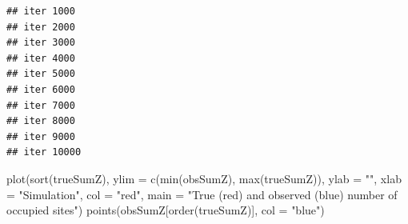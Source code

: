 \documentclass[
]{book}
\newenvironment{Shaded}{\begin{snugshade}}{\end{snugshade}}
\newcommand{\AttributeTok}[1]{\textcolor[rgb]{0.77,0.63,0.00}{#1}}
\newcommand{\CommentTok}[1]{\textcolor[rgb]{0.56,0.35,0.01}{\textit{#1}}}
\newcommand{\ConstantTok}[1]{\textcolor[rgb]{0.00,0.00,0.00}{#1}}
\newcommand{\ControlFlowTok}[1]{\textcolor[rgb]{0.13,0.29,0.53}{\textbf{#1}}}
\newcommand{\DecValTok}[1]{\textcolor[rgb]{0.00,0.00,0.81}{#1}}
\newcommand{\FunctionTok}[1]{\textcolor[rgb]{0.00,0.00,0.00}{#1}}
\newcommand{\NormalTok}[1]{#1}
\newcommand{\OtherTok}[1]{\textcolor[rgb]{0.56,0.35,0.01}{#1}}
\newcommand{\SpecialCharTok}[1]{\textcolor[rgb]{0.00,0.00,0.00}{#1}}
\newcommand{\StringTok}[1]{\textcolor[rgb]{0.31,0.60,0.02}{#1}}
\begin{document}
\begin{Shaded}
\end{Shaded}

\begin{verbatim}
## iter 1000 
## iter 2000 
## iter 3000 
## iter 4000 
## iter 5000 
## iter 6000 
## iter 7000 
## iter 8000 
## iter 9000 
## iter 10000
\end{verbatim}

\begin{Shaded}
\begin{Highlighting}[]
\FunctionTok{plot}\NormalTok{(}\FunctionTok{sort}\NormalTok{(trueSumZ), }\AttributeTok{ylim =} \FunctionTok{c}\NormalTok{(}\FunctionTok{min}\NormalTok{(obsSumZ), }\FunctionTok{max}\NormalTok{(trueSumZ)), }\AttributeTok{ylab =} \StringTok{""}\NormalTok{, }\AttributeTok{xlab =} \StringTok{"Simulation"}\NormalTok{,}
     \AttributeTok{col =} \StringTok{"red"}\NormalTok{, }\AttributeTok{main =} \StringTok{"True (red) and observed (blue) number of occupied sites"}\NormalTok{)}
\FunctionTok{points}\NormalTok{(obsSumZ[}\FunctionTok{order}\NormalTok{(trueSumZ)], }\AttributeTok{col =} \StringTok{"blue"}\NormalTok{)}
\end{Highlighting}
\end{Shaded}
\end{document}
